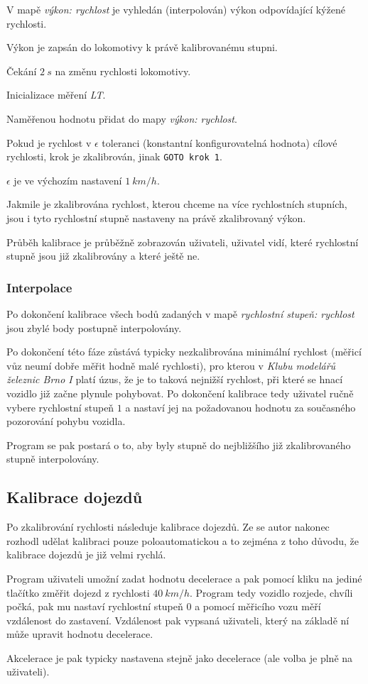\begin{compactenum}
\item V mapě \textit{výkon: rychlost} je vyhledán (interpolován) výkon odpovídající
      kýžené rychlosti.
\item Výkon je zapsán do lokomotivy k právě kalibrovanému stupni.
\item Čekání $2\ s$ na změnu rychlosti lokomotivy.
\item Inicializace měření \textit{LT}.
\item Naměřenou hodnotu přidat do mapy \textit{výkon: rychlost}.
\item Pokud je rychlost v $\epsilon$ toleranci (konstantní konfigurovatelná hodnota)
      cílové rychlosti, krok je zkalibrován, jinak \texttt{GOTO krok 1}.
\end{compactenum}

$\epsilon$ je ve výchozím nastavení $1\ km/h$.

Jakmile je zkalibrována rychlost, kterou chceme na více rychlostních stupních,
jsou i tyto rychlostní stupně nastaveny na právě zkalibrovaný výkon.

Průběh kalibrace je průběžně zobrazován uživateli, uživatel vidí, které rychlostní
stupně jsou již zkalibrovány a které ještě ne.

\subsubsection{Interpolace}

Po dokončení kalibrace všech bodů zadaných v mapě \textit{rychlostní stupeň:
rychlost} jsou zbylé body postupně interpolovány.

Po dokončení této fáze zůstává typicky nezkalibrována minimální rychlost
(měřicí vůz neumí dobře měřit hodně malé rychlosti), pro kterou v \textit{Klubu
modelářů železnic Brno I} platí úzus, že je to taková nejnižší rychlost, při
které se hnací vozidlo již začne plynule pohybovat.  Po dokončení kalibrace
tedy uživatel ručně vybere rychlostní stupeň $1$ a nastaví jej na požadovanou
hodnotu za současného pozorování pohybu vozidla.

Program se pak postará o to, aby byly stupně do nejbližšího již zkalibrovaného
stupně interpolovány.


\subsection{Kalibrace dojezdů}

Po zkalibrování rychlosti následuje kalibrace dojezdů. Ze se autor nakonec
rozhodl udělat kalibraci pouze poloautomatickou a to zejména z toho důvodu,
že kalibrace dojezdů je již velmi rychlá.

Program uživateli umožní zadat hodnotu decelerace a pak pomocí kliku na jediné
tlačítko změřit dojezd z rychlosti $40\ km/h$. Program tedy vozidlo rozjede,
chvíli počká, pak mu nastaví rychlostní stupeň $0$ a pomocí měřicího vozu
měří vzdálenost do zastavení. Vzdálenost pak vypsaná uživateli, který na základě
ní může upravit hodnotu decelerace.

Akcelerace je pak typicky nastavena stejně jako decelerace (ale volba je plně
na uživateli).
